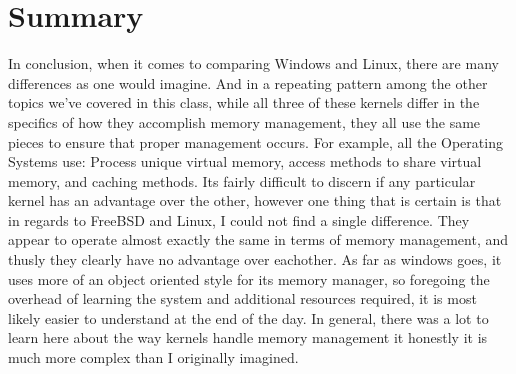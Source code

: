 \documentclass[10pt,draftclsnofoot,onecolumn]{IEEEtran}
\begin{document}
\newpage
\section{Summary}

In conclusion, when it comes to comparing Windows and Linux, there are many
differences as one would imagine. And in a repeating pattern among the other
topics we've covered in this class, while all three of these kernels differ in
the specifics of how they accomplish memory management, they all use the same
pieces to ensure that proper management occurs. For example, all the Operating
Systems use: Process unique virtual memory, access methods to share virtual
memory, and caching methods. Its fairly difficult to discern if any particular
kernel has an advantage over the other, however one thing that is certain is that
in regards to FreeBSD and Linux, I could not find a single difference. They
appear to operate almost exactly the same in terms of memory management, and
thusly they clearly have no advantage over eachother. As far as windows goes, it
uses more of an object oriented style for its memory manager, so foregoing the
overhead of learning the system and additional resources required, it is most
likely easier to understand at the end of the day. In general, there was a lot to
learn here about the way kernels handle memory management it honestly it is
much more complex than I originally imagined.
\end{document}
